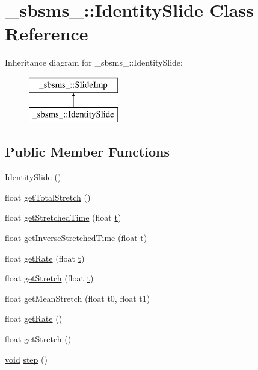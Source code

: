 \hypertarget{class__sbsms___1_1_identity_slide}{}\section{\+\_\+sbsms\+\_\+\+:\+:Identity\+Slide Class Reference}
\label{class__sbsms___1_1_identity_slide}
Inheritance diagram for \+\_\+sbsms\+\_\+\+:\+:Identity\+Slide\+:\begin{figure}[H]
\begin{center}
\leavevmode
\includegraphics[height=2.000000cm]{class__sbsms___1_1_identity_slide}
\end{center}
\end{figure}
\subsection*{Public Member Functions}
\begin{DoxyCompactItemize}
\item 
\hyperlink{class__sbsms___1_1_identity_slide_ad95b2cd576985481005f9b6d3a7b4ef2}{Identity\+Slide} ()
\item 
float \hyperlink{class__sbsms___1_1_identity_slide_a96b6d7379086538d8ba95a5e3e8bfd98}{get\+Total\+Stretch} ()
\item 
float \hyperlink{class__sbsms___1_1_identity_slide_a9d8c69aa3dbb552b4930e543cb6c78cb}{get\+Stretched\+Time} (float \hyperlink{octave__test_8m_aaccc9105df5383111407fd5b41255e23}{t})
\item 
float \hyperlink{class__sbsms___1_1_identity_slide_aafadb34d3388ac1199ead896c94a37b1}{get\+Inverse\+Stretched\+Time} (float \hyperlink{octave__test_8m_aaccc9105df5383111407fd5b41255e23}{t})
\item 
float \hyperlink{class__sbsms___1_1_identity_slide_a4fd4100559c1ee2aa280e6a90f4b0fba}{get\+Rate} (float \hyperlink{octave__test_8m_aaccc9105df5383111407fd5b41255e23}{t})
\item 
float \hyperlink{class__sbsms___1_1_identity_slide_aa2e7a2327e2f38085f69574ef4f116ef}{get\+Stretch} (float \hyperlink{octave__test_8m_aaccc9105df5383111407fd5b41255e23}{t})
\item 
float \hyperlink{class__sbsms___1_1_identity_slide_a49cf7f754a939994fbf4f1b1e65438fc}{get\+Mean\+Stretch} (float t0, float t1)
\item 
float \hyperlink{class__sbsms___1_1_identity_slide_ac66bbfb7efe96a1549bb8bca27c1a238}{get\+Rate} ()
\item 
float \hyperlink{class__sbsms___1_1_identity_slide_a6f5f8841f42490f59b2e95dc05d04862}{get\+Stretch} ()
\item 
\hyperlink{sound_8c_ae35f5844602719cf66324f4de2a658b3}{void} \hyperlink{class__sbsms___1_1_identity_slide_a3a56dcfb1c36c0ae5f7fd0e252e9a9b1}{step} ()
\end{DoxyCompactItemize}


